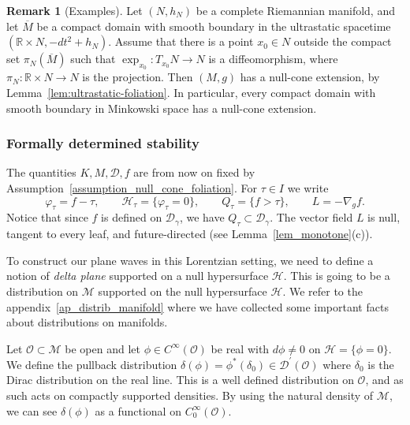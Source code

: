 \documentclass[12pt,reqno]{amsart}
\numberwithin{equation}{section}
\theoremstyle{definition}
\theoremstyle{plain}
\theoremstyle{definition}
\theoremstyle{definition}
\newtheorem{remark}[theorem]{Remark}
\newcommand{\R}{\mathbb{R}}
\newcommand{\n}{\mathcal{H}}
\newcommand{\M}{\mathcal{M}}
\newcommand{\D}{\mathcal{D}}
\newcommand{\dg}{\D_\gamma}
\newcommand{\uu}{M}
\def\R{\mathbb R}
\begin{document}
\begin{remark}[Examples]\label{rem_examples}
Let $(N,h_N)$ be a complete Riemannian manifold, and let $\overline\uu$ be a compact domain with smooth boundary in the ultrastatic spacetime $(\R\times N,-dt^2+h_N)$. Assume that there is a point $x_0\in N$ outside the compact set $\pi_N(\overline\uu)$ such that $\exp_{x_0}\colon T_{x_0}N\to N$ is a diffeomorphism, where $\pi_N\colon\R\times N\to N$ is the projection. Then $(\uu,g)$ has a null-cone extension, by Lemma~\ref{lem:ultrastatic-foliation}. In particular, every compact domain with smooth boundary in Minkowski space has a null-cone extension.
\end{remark}


\subsubsection{Formally determined stability}\label{sec:intro_fd}

The quantities $K, \uu, \mathcal{D}, f$ are from now on fixed by Assumption~\ref{assumption_null_cone_foliation}. For $\tau\in I$ we write
 \begin{equation}
 \label{def_of_quantities}
     \varphi_{\tau} = f-\tau, \qquad \mathcal{H}_{\tau} = \{\varphi_{\tau}=0\}, \qquad Q_{\tau} = \{f>\tau\},\qquad L = -\nabla_g f .
 \end{equation}
Notice that since $f$ is defined on $\dg$, we have $Q_\tau\subset\dg$. The vector field $L$ is null, tangent to every leaf, and future-directed (see Lemma~\ref{lem_monotone}(c)).

To construct our plane waves in this Lorentzian setting, we need to define a notion of \textit{delta plane} supported on a null hypersurface $\n$. This is going to be a distribution on $\M$ supported on the null hypersurface $\n$. We refer to the appendix~\ref{ap_distrib_manifold} where we have collected some important facts about distributions on manifolds.

Let $\mathcal O\subset\M$ be open and let $\phi\in C^\infty(\mathcal O)$ be real with $d\phi \neq 0 $ on $\n=\{\phi=0\}$. We define the pullback distribution $\delta(\phi)=\phi^*(\delta_0) \in \mathcal{D}^\prime(\mathcal O) $ where $\delta_0$ is the Dirac distribution on the real line. This is a well defined distribution on $\mathcal O$, and as such acts on compactly supported densities. By using the natural density of $\M$, we can see $\delta(\phi)$ as a functional on $C^\infty_0(\mathcal O)$.
\end{document}
